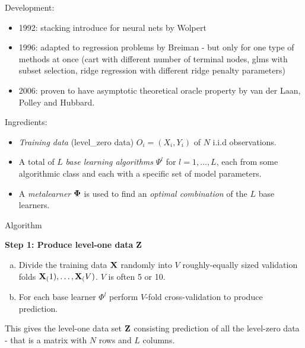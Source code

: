 \documentclass[
  ignorenonframetext,
]{beamer}
\providecommand{\tightlist}{%
  \setlength{\itemsep}{0pt}\setlength{\parskip}{0pt}}
\begin{document}
\begin{frame}

\begin{block}{Development:}

\begin{itemize}
\tightlist
\item
  1992: stacking introduce for neural nets by Wolpert
\item
  1996: adapted to regression problems by Breiman - but only for one
  type of methods at once (cart with different number of terminal nodes,
  glms with subset selection, ridge regression with different ridge
  penalty parameters)
\item
  2006: proven to have asymptotic theoretical oracle property by van der
  Laan, Polley and Hubbard.
\end{itemize}

\end{block}

\end{frame}

\begin{frame}

\begin{block}{Ingredients:}

\begin{itemize}
\tightlist
\item
  \emph{Training data} (level\_zero data) \(O_i=(X_i,Y_i)\) of \(N\)
  i.i.d observations.
\item
  A total of \(L\) \emph{base learning algorithms} \(\Psi^l\) for
  \(l=1,\ldots,L\), each from some algorithmic class and each with a
  specific set of model parameters.
\item
  A \emph{metalearner} \({\bf \Phi}\) is used to find an \emph{optimal
  combination} of the \(L\) base learners.
\end{itemize}

\end{block}

\end{frame}

\begin{frame}

\begin{block}{Algorithm}

\textbf{Step 1: Produce level-one data} \({\bf Z}\)

\begin{enumerate}
[a)]
\item
  Divide the training data \({\bf X}\) randomly into \(V\)
  roughly-equally sized validation folds
  \({\bf X}_(1),\ldots,{\bf X}_(V)\). \(V\) is often 5 or 10.
\item
  For each base learner \(\Phi^l\) perform \(V\)-fold cross-validation
  to produce prediction.
\end{enumerate}

This gives the level-one data set \({\bf Z}\) consisting prediction of
all the level-zero data - that is a matrix with \(N\) rows and \(L\)
columns.

\end{block}

\end{frame}
\end{document}
